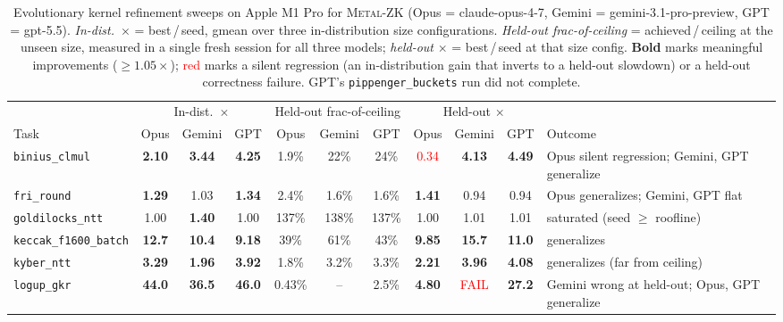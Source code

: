 \begin{table}[t]
\centering
\caption{Evolutionary kernel refinement sweeps on Apple M1 Pro for \textsc{Metal-ZK} (Opus = claude-opus-4-7, Gemini = gemini-3.1-pro-preview, GPT = gpt-5.5). \emph{In-dist.}\ $\times$ = best\,/\,seed, gmean over three in-distribution size configurations. \emph{Held-out frac-of-ceiling} = achieved\,/\,ceiling at the unseen size, measured in a single fresh session for all three models; \emph{held-out} $\times$ = best\,/\,seed at that size config. \textbf{Bold} marks meaningful improvements ($\ge 1.05\times$); \textcolor{red}{red} marks a silent regression (an in-distribution gain that inverts to a held-out slowdown) or a held-out correctness failure. GPT's \texttt{pippenger\_buckets} run did not complete.}
\label{tab:metalzk-main}
\small
\setlength{\tabcolsep}{4pt}
\begin{tabular}{l ccc ccc ccc l}
\toprule
& \multicolumn{3}{c}{In-dist.\ $\times$} & \multicolumn{3}{c}{Held-out frac-of-ceiling} & \multicolumn{3}{c}{Held-out $\times$} & \\
\cmidrule(lr){2-4}\cmidrule(lr){5-7}\cmidrule(lr){8-10}
Task & Opus & Gemini & GPT & Opus & Gemini & GPT & Opus & Gemini & GPT & Outcome \\
\midrule
\texttt{binius\_clmul} & \textbf{2.10} & \textbf{3.44} & \textbf{4.25} & 1.9\% & 22\% & 24\% & \textcolor{red}{0.34} & \textbf{4.13} & \textbf{4.49} & Opus silent regression; Gemini, GPT generalize \\
\texttt{fri\_round} & \textbf{1.29} & 1.03 & \textbf{1.34} & 2.4\% & 1.6\% & 1.6\% & \textbf{1.41} & 0.94 & 0.94 & Opus generalizes; Gemini, GPT flat \\
\texttt{goldilocks\_ntt} & 1.00 & \textbf{1.40} & 1.00 & 137\% & 138\% & 137\% & 1.00 & 1.01 & 1.01 & saturated (seed $\ge$ roofline) \\
\texttt{keccak\_f1600\_batch} & \textbf{12.7} & \textbf{10.4} & \textbf{9.18} & 39\% & 61\% & 43\% & \textbf{9.85} & \textbf{15.7} & \textbf{11.0} & generalizes \\
\texttt{kyber\_ntt} & \textbf{3.29} & \textbf{1.96} & \textbf{3.92} & 1.8\% & 3.2\% & 3.3\% & \textbf{2.21} & \textbf{3.96} & \textbf{4.08} & generalizes (far from ceiling) \\
\texttt{logup\_gkr} & \textbf{44.0} & \textbf{36.5} & \textbf{46.0} & 0.43\% & -- & 2.5\% & \textbf{4.80} & \textcolor{red}{FAIL} & \textbf{27.2} & Gemini wrong at held-out; Opus, GPT generalize \\

\end{tabular}
\end{table}
